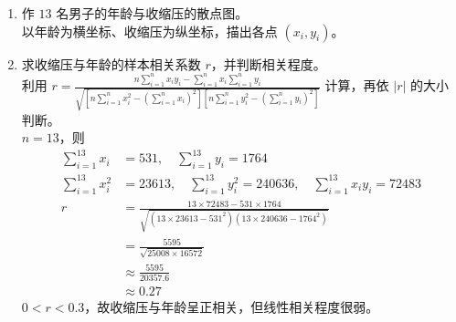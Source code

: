 \documentclass[12pt,a4paper]{exam-zh}
\begin{document}
\begin{solution}
    \begin{enumerate}[label=(\alph*)]
        \item 作 $13$ 名男子的年龄与收缩压的散点图。\\
        以年龄为横坐标、收缩压为纵坐标，描出各点 $(x_i,y_i)$。
        \begin{center}
        \end{center}

        \item 求收缩压与年龄的样本相关系数 $r$，并判断相关程度。\\
        利用 $\displaystyle r=\frac{n\sum\limits_{i=1}^{n}x_iy_i-\sum\limits_{i=1}^{n}x_i\sum\limits_{i=1}^{n}y_i}{\sqrt{\left[n\sum\limits_{i=1}^{n}x_i^2-\left(\sum\limits_{i=1}^{n}x_i\right)^2\right]\left[n\sum\limits_{i=1}^{n}y_i^2-\left(\sum\limits_{i=1}^{n}y_i\right)^2\right]}}$ 计算，再依 $|r|$ 的大小判断。\\
        $n=13$，则
        \begin{align*}
            \sum\limits_{i=1}^{13}x_i &= 531, \quad \sum\limits_{i=1}^{13}y_i=1764 \\
            \sum\limits_{i=1}^{13}x_i^2 &= 23613, \quad \sum\limits_{i=1}^{13}y_i^2=240636, \quad \sum\limits_{i=1}^{13}x_iy_i=72483 \\
            r &= \frac{13\times 72483-531\times 1764}{\sqrt{\left(13\times 23613-531^2\right)\left(13\times 240636-1764^2\right)}} \\
            &= \frac{5595}{\sqrt{25008\times 16572}} \\
            &\approx \frac{5595}{20357.6} \\
            &\approx 0.27
        \end{align*}
        $0<r<0.3$，故收缩压与年龄呈正相关，但线性相关程度很弱。
    \end{enumerate}
\end{solution}
\end{document}
